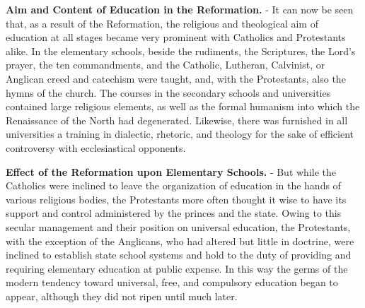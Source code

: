 \documentclass[
]{book}
\begin{document}
\textbf{Aim and Content of Education in the Reformation.} - It can now be seen that, as a result of the Reformation, the religious and theological aim of education at all stages became very prominent with Catholics and Protestants alike. In the elementary schools, beside the rudiments, the Scriptures, the Lord's prayer, the ten commandments, and the Catholic, Lutheran, Calvinist, or Anglican creed and catechism were taught, and, with the Protestants, also the hymns of the church. The courses in the secondary schools and universities contained large religious elements, as well as the formal humanism into which the Renaissance of the North had degenerated. Likewise, there was furnished in all universities a training in dialectic, rhetoric, and theology for the sake of efficient controversy with ecclesiastical opponents.

\textbf{Effect of the Reformation upon Elementary Schools.} - But while the Catholics were inclined to leave the organization of education in the hands of various religious bodies, the Protestants more often thought it wise to have its support and control administered by the princes and the state. Owing to this secular management and their position on universal education, the Protestants, with the exception of the Anglicans, who had altered but little in doctrine, were inclined to establish state school systems and hold to the duty of providing and requiring elementary education at public expense. In this way the germs of the modern tendency toward universal, free, and compulsory education began to appear, although they did not ripen until much later.
\end{document}
